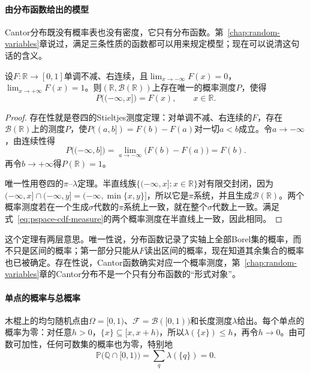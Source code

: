\paragraph{由分布函数给出的模型}
Cantor分布既没有概率表也没有密度，它只有分布函数。第~\ref{chap:random-variables}章说过，满足三条性质的函数都可以用来规定模型；现在可以说清这句话的含义。

\begin{theorem}[分布函数确定实轴上的概率]
\label{thm:pspace-cdf-measure}
设$F:\mathbb{R}\to[0,1]$单调不减、右连续，且$\lim_{x\to-\infty}F(x)=0$，$\lim_{x\to+\infty}F(x)=1$。则$(\mathbb{R},\mathcal{B}(\mathbb{R}))$上存在唯一的概率测度$P$，使得
\begin{equation}
  P\bigl((-\infty,x]\bigr)=F(x),\qquad x\in\mathbb{R}.
  \label{eq:pspace-cdf-measure}
\end{equation}
\end{theorem}

\begin{proof}
存在性就是卷四的Stieltjes测度定理：对单调不减、右连续的$F$，存在$\mathcal{B}(\mathbb{R})$上的测度$P$，使$P((a,b])=F(b)-F(a)$对一切$a<b$成立。令$a\to-\infty$，由连续性得
\[
  P\bigl((-\infty,b]\bigr)=\lim_{a\to-\infty}\bigl(F(b)-F(a)\bigr)=F(b).
\]
再令$b\to+\infty$得$P(\mathbb{R})=1$。

唯一性用卷四的$\pi$--$\lambda$定理。半直线族$\{(-\infty,x]:x\in\mathbb{R}\}$对有限交封闭，因为$(-\infty,x]\cap(-\infty,y]=(-\infty,\min\{x,y\}]$，所以它是$\pi$系统，并且生成$\mathcal{B}(\mathbb{R})$。两个概率测度若在一个生成$\sigma$代数的$\pi$系统上一致，就在整个$\sigma$代数上一致。满足式~\eqref{eq:pspace-cdf-measure}的两个概率测度在半直线上一致，因此相同。
\end{proof}

这个定理有两层意思。唯一性说，分布函数记录了实轴上全部Borel集的概率，而不只是区间的概率；第一部分只能从$F$读出区间的概率，现在知道其余集合的概率也已被确定。存在性说，Cantor函数确实对应一个概率测度，第~\ref{chap:random-variables}章的Cantor分布不是一个只有分布函数的“形式对象”。

\paragraph{单点的概率与总概率}
木棍上的均匀随机点由$\Omega=[0,1)$、$\mathcal{F}=\mathcal{B}([0,1))$和长度测度$\lambda$给出。每个单点的概率为零：对任意$h>0$，$\{x\}\subseteq[x,x+h)$，所以$\lambda(\{x\})\leq h$，再令$h\to0$。由可数可加性，任何可数集的概率也为零，特别地
\[
  \mathbb{P}\bigl(\mathbb{Q}\cap[0,1)\bigr)=\sum_{q}\lambda(\{q\})=0 .
\]

